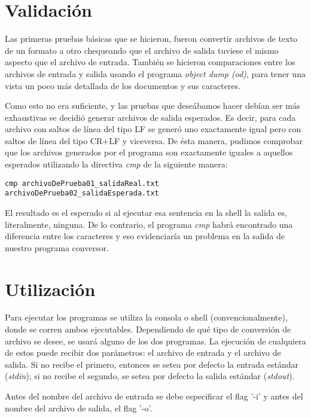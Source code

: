 \documentclass[a4paper,11pt]{article}
\begin{document}
\section{Validación}
Las primeras pruebas básicas que se hicieron, fueron convertir archivos de texto de un formato a otro chequeando que el archivo de salida tuviese el mismo aspecto que el archivo de entrada. También se hicieron comparaciones entre los archivos de entrada y salida usando el programa \textit{object dump (od)}, para tener una vista un poco más detallada de los documentos y sus caracteres.

\indent Como esto no era suficiente, y las pruebas que deseábamos hacer debían ser más exhaustivas se decidió generar archivos de salida esperados. Es decir, para cada archivo con saltos de línea del tipo LF se generó uno exactamente igual pero con saltos de línea del tipo CR+LF y viceversa. De ésta manera, pudimos comprobar que los archivos generados por el programa son exactamente iguales a aquellos esperados utilizando la directiva \textit{cmp} de la siguiente manera:

\begin{verbatim}
cmp archivoDePrueba01_salidaReal.txt archivoDePrueba02_salidaEsperada.txt
\end{verbatim}

\indent El resultado es el esperado si al ejecutar esa sentencia en la shell la salida es, literalmente, ninguna. De lo contrario, el programa \textit{cmp} habrá encontrado una diferencia entre los caracteres y eso evidenciaría un problema en la salida de nuestro programa conversor.



\section{Utilización}
Para ejecutar los programas se utiliza la consola o shell (convencionalmente), donde se corren ambos ejecutables. Dependiendo de qué tipo de conversión de archivo se desee, se usará alguno de los dos programas. La ejecución de cualquiera de estos puede recibir dos parámetros: el archivo de entrada y el archivo de salida. Si no recibe el primero, entonces se setea por defecto la entrada estándar (\textit{stdin}); si no recibe el segundo, se setea por defecto la salida estándar (\textit{stdout}).

\indent	
Antes del nombre del archivo de entrada se debe especificar el flag '-i' y antes del nombre del archivo de salida, el flag '-o'.
\end{document}
